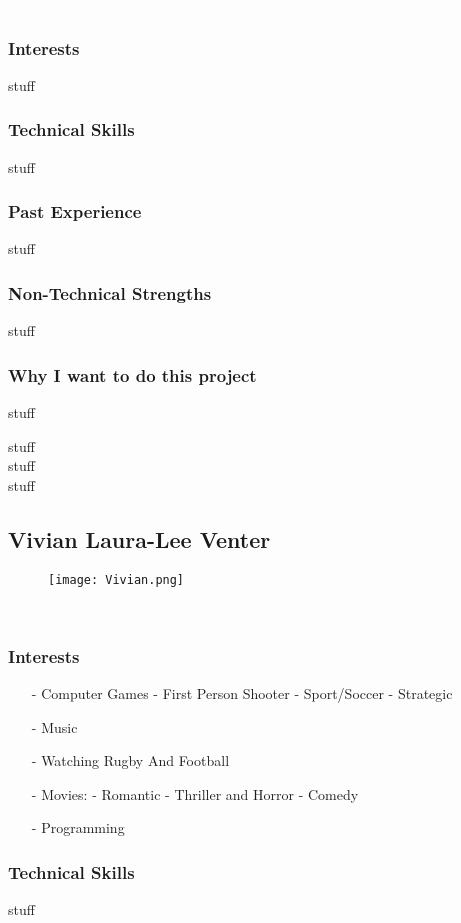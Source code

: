 \textcolor{white}{.}
\subsubsection{Interests}  stuff
\subsubsection{Technical Skills} stuff
\subsubsection{Past Experience} stuff
\subsubsection{Non-Technical Strengths} stuff
\subsubsection{Why I want to do this project} stuff 

stuff \\
stuff \\
stuff \\


\subsection{Vivian Laura-Lee Venter}
\begin{wrapfigure}[7]{l}{0.25\textwidth}
\vspace{10pt}
\texttt{[image: Vivian.png]}
\end{wrapfigure}

\textcolor{white}{.}
\subsubsection{Interests}
\begin{itemize}
	\item[-]{Computer Games}
		\subitem- First Person Shooter
		\subitem- Sport/Soccer
		\subitem- Strategic
	\item[-]{Music}
	\item[-]{Watching Rugby And Football}
	\item[-]{Movies:}
		\subitem- Romantic
		\subitem- Thriller and Horror
		\subitem- Comedy
	\item[-]{Programming}
\end{itemize}
\subsubsection{Technical Skills} stuff
